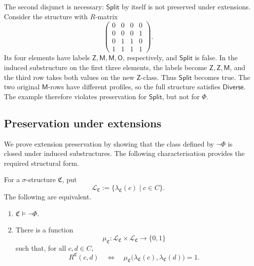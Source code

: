 \documentclass{lmcs}
\newcommand{\C}{\mathfrak{C}}
\newcommand{\Zt}{\mathsf{Z}}
\newcommand{\Ot}{\mathsf{O}}
\newcommand{\Mt}{\mathsf{M}}
\begin{document}
The second disjunct is necessary: \(\mathsf{Split}\) by itself is not preserved
under extensions.  Consider the structure with \(R\)-matrix
\[
\begin{pmatrix}
0&0&0&0\\
0&0&0&1\\
0&1&1&0\\
1&1&1&1
\end{pmatrix}.
\]
Its four elements have labels \(\Zt,\Mt,\Mt,\Ot\), respectively, and
\(\mathsf{Split}\) is false.  In the induced substructure on the first three
elements, the labels become \(\Zt,\Zt,\Mt\), and the third row takes both values
on the new \(\Zt\)-class.  Thus \(\mathsf{Split}\) becomes true.  The two
original \(\Mt\)-rows have different profiles, so the full structure satisfies
\(\mathsf{Diverse}\).  The example therefore violates preservation for
\(\mathsf{Split}\), but not for \(\Phi\).

\subsection{Preservation under extensions}
\label{sec:extension-preservation}

We prove extension preservation by showing that the class defined by
\(\neg\Phi\) is closed under induced substructures.  The following
characterisation provides the required structural form.

\begin{lem}
\label{lem:label-matrix}
For a \(\sigma\)-structure \(\C\), put
\[
  \mathcal L_{\C}:=
  \{\lambda_{\C}(c)\mid c\in C\}.
\]
The following are equivalent.
\begin{enumerate}[label=\textup{(\roman*)}]
  \item \(\C\models\neg\Phi\).
  \item There is a function
  \[
    \mu_{\C}:\mathcal L_{\C}\times\mathcal L_{\C}
    \longrightarrow\{0,1\}
  \]
  such that, for all \(c,d\in C\),
  \begin{equation}
    R^{\C}(c,d)
    \quad\Longleftrightarrow\quad
    \mu_{\C}\bigl(\lambda_{\C}(c),\lambda_{\C}(d)\bigr)=1.
    \label{eq:label-matrix}
  \end{equation}
\end{enumerate}
\end{lem}
\end{document}
